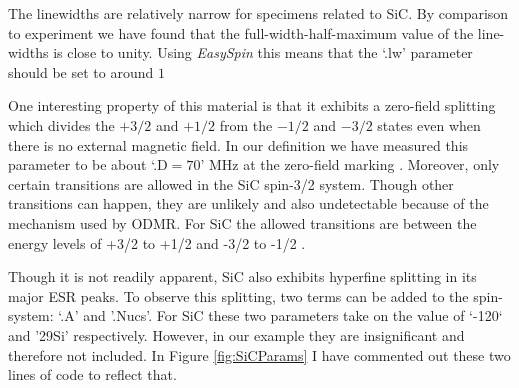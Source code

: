 \documentclass[oneside, astronomy, noacknowlegments]{BYUPhys}
\begin{document}
The linewidths are relatively narrow for specimens related to SiC. By comparison to experiment we have found that the full-width-half-maximum value of the line-widths is close to unity. Using \textit{EasySpin} this means that the `.lw' parameter should be set to around $1$

One interesting property of this material is that it exhibits a zero-field splitting which divides the $+3/2$ and $+1/2$ from the $-1/2$ and $-3/2$ states even when there is no external magnetic field. In our definition we have measured this parameter to be about `.D$=70$' MHz at the zero-field marking \cite{RefWorks:doc:5892964ee4b0499fa95c5108}. Moreover, only certain transitions are allowed in the SiC spin-3/2 system. Though other transitions can happen, they are unlikely and also undetectable because of the mechanism used by ODMR. For SiC the allowed transitions are between the energy levels of +3/2 to +1/2 and -3/2 to -1/2 \cite{RefWorks:doc:5892964ee4b0499fa95c5108}.

Though it is not readily apparent, SiC also exhibits hyperfine splitting in its major ESR peaks. To observe this splitting, two terms can be added to the spin-system: `.A' and '.Nucs'. For SiC these two parameters take on the value of `-120` and '29Si' respectively. However, in our example they are insignificant and therefore not included. In Figure \ref{fig:SiCParams} I have commented out these two lines of code to reflect that.
\end{document}
